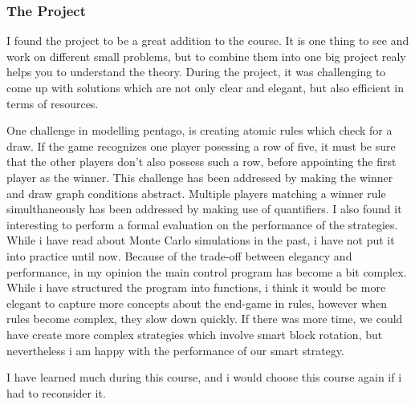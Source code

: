 \subsubsection{The Project}

I found the project to be a great addition to the course.  It is one thing to see and work on different small problems, but to combine them into one big project realy helps you to understand the theory.
During the project, it was challenging to come up with solutions which are not only clear and elegant, but also efficient in terms of resources.

\vspace{6pt}

One challenge in modelling pentago, is creating atomic rules which check for a draw. If the game recognizes one player posessing a row of five, it must be sure that the other players don't also possess such a row, before appointing the first player as the winner.
This challenge has been addressed by making the winner and draw graph conditions abstract.
Multiple players matching a winner rule simulthaneously has been addressed by making use of quantifiers.
I also found it interesting to perform a formal evaluation on the performance of the strategies. While i have read about Monte Carlo simulations in the past, i have not put it into practice until now.
Because of the trade-off between elegancy and performance, in my opinion the main control program has become a bit complex.
While i have structured the program into functions, i think it would be more elegant to capture more concepts about the end-game in rules, however when rules become complex, they slow down quickly.
If there was more time, we could have create more complex strategies which involve smart block rotation, but nevertheless i am happy with the performance of our smart strategy.
\vspace{6pt}

I have learned much during this course, and i would choose this course again if i had to reconsider it.
